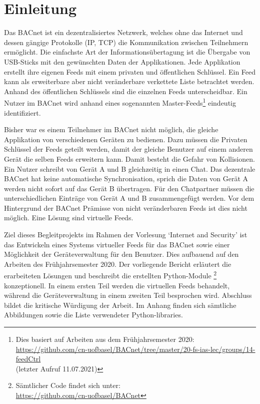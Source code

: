 \documentclass[a4paper,titlepage]{article}
\begin{document}
\section{Einleitung}

Das BACnet ist ein dezentralisiertes Netzwerk, welches ohne das Internet und dessen gängige Protokolle (IP, TCP) die Kommunikation zwischen Teilnehmern ermöglicht. Die einfachste Art der Informationsübertagung ist die Übergabe von USB-Sticks mit den gewünschten Daten der Applikationen. Jede Applikation erstellt ihre eigenen Feeds mit einem privaten und öffentlichen Schlüssel. Ein Feed kann als erweiterbare aber nicht veränderbare verkettete Liste betrachtet werden. Anhand des öffentlichen Schlüssels sind die einzelnen Feeds unterscheidbar. Ein Nutzer im BACnet wird anhand eines sogenannten Master-Feeds\footnote{Dies basiert auf Arbeiten aus dem Frühjahrsemester 2020: \\ \url{https://github.com/cn-uofbasel/BACnet/tree/master/20-fs-ias-lec/groups/14-feedCtrl} \\ (letzter Aufruf 11.07.2021)} eindeutig identifiziert.

Bisher war es einem Teilnehmer im BACnet nicht möglich, die gleiche Applikation von verschiedenen Geräten zu bedienen. Dazu müssen die Privaten Schlüssel der Feeds geteilt werden, damit der gleiche Benutzer auf einem anderen Gerät die selben Feeds erweitern kann. Damit besteht die Gefahr von Kollisionen. Ein Nutzer schreibt von Gerät A und B gleichzeitig in einen Chat. Das dezentrale BACnet hat keine automatische Synchronisation, sprich die Daten von Gerät A werden nicht sofort auf das Gerät B übertragen. Für den Chatpartner müssen die unterschiedlichen Einträge von Gerät A und B zusammengefügt werden. Vor dem Hintergrund der BACnet Prämisse von nicht veränderbaren Feeds ist dies nicht möglich. Eine Lösung sind virtuelle Feeds.

Ziel dieses Begleitprojekts im Rahmen der Vorlesung `Internet and Security' ist das Entwickeln eines Systems virtueller Feeds für das BACnet sowie einer Möglichkeit der Geräteverwaltung für den Benutzer. Dies aufbauend auf den Arbeiten des Frühjahrsemester 2020. Der vorliegende Bericht erläutert die erarbeiteten Lösungen und beschreibt die erstellten Python-Module \footnote{Sämtlicher Code findet sich unter: \\ \url{https://github.com/cn-uofbasel/BACnet}} konzeptionell. In einem ersten Teil werden die virtuellen Feeds behandelt, während die Geräteverwaltung in einem zweiten Teil besprochen wird. Abschluss bildet die kritische Würdigung der Arbeit. Im Anhang finden sich sämtliche Abbildungen sowie die Liste verwendeter Python-libraries.
\end{document}
